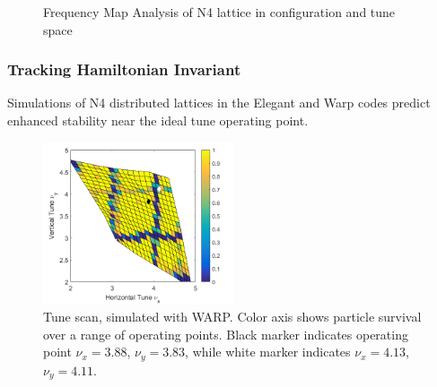 \begin{figure}
 	\caption{Frequency Map Analysis of N4 lattice in configuration and tune space}
   \label{fig:N4fma}
\end{figure}







\subsubsection{Tracking Hamiltonian Invariant}

Simulations of N4 distributed lattices in the Elegant and Warp codes predict enhanced stability near the ideal tune operating point. 

\begin{figure}[]
   \centering
    \includegraphics[width=0.5\textwidth]{8.figures/warp_tune_scan_plot.png}
 	\caption{Tune scan, simulated with WARP. Color axis shows particle survival over a range of operating points. Black marker indicates operating point $\nu_x=3.88$, $\nu_y=3.83$, while white marker indicates $\nu_x=4.13$, $\nu_y=4.11$.}
   \label{fig:warpscan}
\end{figure}


